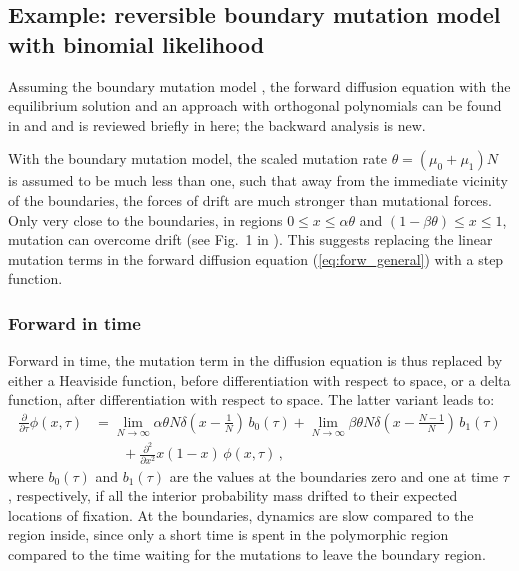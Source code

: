 \documentclass[preprint]{elsarticle}
\begin{document}
\subsection{Example: reversible boundary mutation model with binomial likelihood}

Assuming the boundary mutation model \citep{Vogl15,Vogl16}, the forward diffusion equation with the equilibrium solution and an approach with orthogonal polynomials can be found in \citet{Vogl14b} and \citet{Vogl16} and is reviewed briefly in here; the backward analysis is new.

With the  boundary mutation model, the scaled mutation rate $\theta=(\mu_0+\mu_1)N$ is assumed to be much less than one, such that away from the immediate vicinity of the boundaries, the forces of drift are much stronger than mutational forces. Only very close to the boundaries, in regions $0\leq x \leq\alpha\theta$ and $(1-\beta\theta) \leq x \leq 1$, mutation can overcome drift (see Fig.~1 in \citet{Vogl15}). This suggests replacing the linear mutation terms in the forward diffusion equation (\ref{eq:forw_general}) with a step function.

\subsubsection{Forward in time}

Forward in time, the mutation term in the diffusion equation is thus replaced by either a Heaviside function, before differentiation with respect to space, or a delta function, after differentiation with respect to space. The latter variant leads to:
\begin{equation}\label{eq:forw_bounddrift}
\begin{split}
\frac{\partial}{\partial \tau} \phi(x,\tau)&=
    \lim_{N\to\infty}\alpha\theta N\delta(x-\tfrac1N) \,b_0(\tau)
    +\lim_{N\to\infty}\beta\theta N\delta(x-\tfrac{N-1}N) \,b_1(\tau)\\
    &\qquad+\frac{\partial^2}{\partial x^2}x(1-x)\,\phi(x,\tau)\,,
\end{split}
\end{equation}
where $b_0(\tau)$ and $b_1(\tau)$ are the values at the boundaries zero and one at time $\tau$, respectively, if all the interior probability mass drifted to their expected locations of fixation. At the boundaries, dynamics are slow compared to the region inside, since only a short time is spent in the polymorphic region compared to the time waiting for the mutations to leave the boundary region. 
\end{document}
